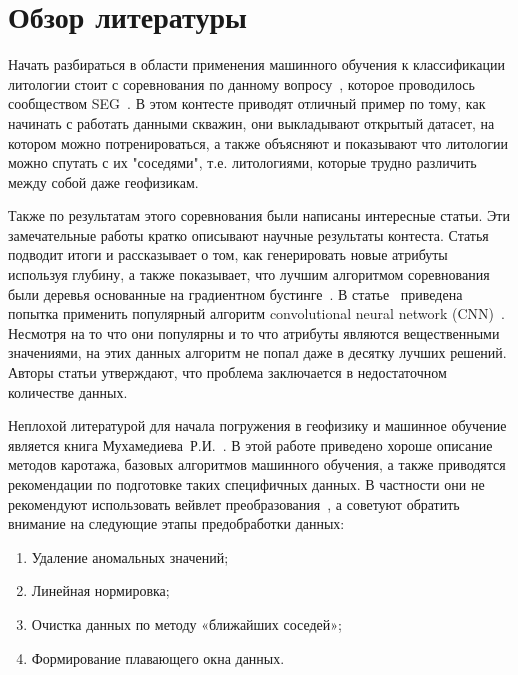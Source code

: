 \documentclass[aps,%
12pt,%
final,%
oneside,
onecolumn,%
musixtex, %
superscriptaddress,%
centertags]{article} %
\begin{document}
\section{Обзор литературы}
Начать разбираться в области применения машинного обучения к классификации литологии
стоит с соревнования по данному вопросу~\cite{SEG-contest}, которое проводилось
сообществом SEG~\cite{SEG}. В этом контесте приводят отличный пример по тому, как начинать
с работать данными скважин, они выкладывают открытый датасет, на котором можно потренироваться,
а также объясняют и показывают что литологии можно спутать с их "соседями", т.е. литологиями,
которые трудно различить между собой даже геофизикам.

Также по результатам этого соревнования были написаны интересные статьи.
Эти замечательные работы кратко описывают научные результаты контеста. Статья~\cite{Bestagini2017a}
подводит итоги и рассказывает о том, как генерировать новые атрибуты используя глубину, а также
показывает, что лучшим алгоритмом соревнования были деревья основанные на градиентном бустинге~\cite{xgboost}.
В статье~\cite{Tschannen2017} приведена попытка применить популярный алгоритм convolutional
neural network (CNN)~\cite{cnn}. Несмотря на то что они популярны и то что атрибуты
являются вещественными значениями, на этих данных алгоритм не попал даже в десятку лучших решений.
Авторы статьи утверждают, что проблема заключается в недостаточном количестве данных.

Неплохой литературой для начала погружения в геофизику и машинное обучение является книга
Мухамедиева~Р.И.~\cite{GeophysicsMLBook}. В этой работе приведено хороше описание методов
каротажа, базовых алгоритмов машинного обучения, а также приводятся рекомендации по подготовке
таких специфичных данных. В частности они не рекомендуют использовать вейвлет
преобразования~\cite{wavelet}, а советуют обратить внимание на следующие этапы предобработки данных:
\begin{enumerate}
  \item Удаление аномальных значений;
  \item Линейная нормировка;
  \item Очистка данных по методу «ближайших соседей»;
  \item Формирование плавающего окна данных.
\end{enumerate}
\end{document}
